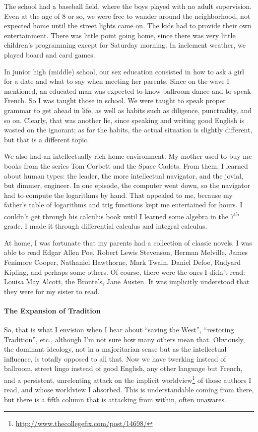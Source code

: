 The school had a baseball field, where the boys played with no adult supervision. Even at the age of 8 or so, we were free to wander around the neighborhood, not expected home until the street lights came on. The kids had to provide their own entertainment. There was little point going home, since there was very little children's programming except for Saturday morning. In inclement weather, we played board and card games.

In junior high (middle) school, our sex education consisted in how to ask a girl for a date and what to say when meeting her parents. Since on the wave I mentioned, an educated man was expected to know ballroom dance and to speak French. So I was taught those in school. We were taught to speak proper grammar to get ahead in life, as well as habits such as diligence, punctuality, and so on. Clearly, that was another lie, since speaking and writing good English is wasted on the ignorant; as for the habits, the actual situation is slightly different, but that is a different topic.

We also had an intellectually rich home environment. My mother used to buy me books from the series Tom Corbett and the Space Cadets. From them, I learned about human types: the leader, the more intellectual navigator, and the jovial, but dimmer, engineer. In one episode, the computer went down, so the navigator had to compute the logarithms by hand. That appealed to me, because my father's table of logarithms and trig functions kept me entertained for hours. I couldn't get through his calculus book until I learned some algebra in the 7\textsuperscript{th} grade. I made it through differential calculus and integral calculus.

At home, I was fortunate that my parents had a collection of classic novels. I was able to read Edgar Allen Poe, Robert Lewis Stevenson, Herman Melville, James Fenimore Cooper, Nathaniel Hawthorne, Mark Twain, Daniel Defoe, Rudyard Kipling, and perhaps some others. Of course, there were the ones I didn't read: Louisa May Alcott, the Bronte's, Jane Austen. It was implicitly understood that they were for my sister to read.

\paragraph{The Expansion of Tradition}


So, that is what I envision when I hear about ``saving the West'', ``restoring Tradition'', etc., although I'm not sure how many others mean that. Obviously, the dominant ideology, not in a majoritarian sense but as the intellectual influence, is totally opposed to all that. Now we have twerking instead of ballroom, street lingo instead of good English, any other language but French, and a persistent, unrelenting attack on the implicit worldview\footnote{\url{http://www.thecollegefix.com/post/14698/}} of those authors I read, and whose worldview I absorbed. This is understandable coming from there, but there is a fifth column that is attacking from within, often unawares.

